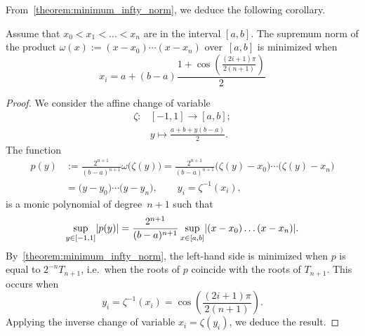 From~\cref{theorem:minimum_infty_norm},
we deduce the following corollary.
\begin{corollary}
    \label{corollary:chebyshev_nodes}
    Assume that $x_0 < x_1 < \dotsc < x_n$ are in the interval $[a, b]$.
    The supremum norm of the product $\omega(x) := (x-x_0) \dotsb (x-x_n)$ over~$[a, b]$ is minimized when
    \begin{equation}
        x_i = a + (b-a) \frac{1 + \cos \left( \frac{(2i + 1) \pi}{2(n+1)} \right)}{2}
    \end{equation}
\end{corollary}
\begin{proof}
    We consider the affine change of variable
    \begin{align*}
        \zeta\colon &[-1, 1] \to [a, b]; \\
                    &y \mapsto \frac{a + b + y (b - a)}{2}.
    \end{align*}
    The function
    \begin{align*}
        p(y) &:= \frac{2^{n+1}}{(b-a)^{n+1}} \omega\bigl(\zeta(y)\bigr) = \frac{2^{n+1}}{(b-a)^{n+1}} \bigl(\zeta(y)-x_0\bigr) \dotsb \bigl(\zeta(y)-x_n\bigr) \\
             &= \bigl(y-y_0\bigr) \dotsb \bigl(y-y_n\bigr), \qquad y_i = \zeta^{-1}(x_i),
    \end{align*}
    is a monic polynomial of degree~$n+1$ such that
    \begin{equation}
        \label{eq:change_of_variable}
        \sup_{y \in [-1, 1]} \lvert p(y)\rvert = \frac{2^{n+1}}{(b-a)^{n+1}} \sup_{x \in [a, b]} \lvert(x-x_0) \dotsc (x - x_n)\rvert.
    \end{equation}
    By~\cref{theorem:minimum_infty_norm},
    the left-hand side is minimized when $p$ is equal to $2^{-n} T_{n+1}$,
    i.e.\ when the roots of $p$ coincide with the roots of $T_{n+1}$.
    This occurs when
    \[
        y_i = \zeta^{-1}(x_i) = \cos \left( \frac{(2i + 1)\pi}{2 (n+1)} \right).
    \]
    Applying the inverse change of variable $x_i = \zeta(y_i)$,
    we deduce the result.
\end{proof}

